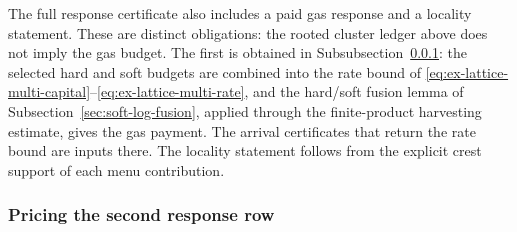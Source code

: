 The full response certificate also includes a paid gas response and a
locality statement. These are distinct obligations: the rooted cluster
ledger above does not imply the gas budget. The first is obtained in
Subsubsection~\ref{subsec:ex-lattice-rg-crowd}: the selected hard and soft
budgets are combined into the rate bound of
\eqref{eq:ex-lattice-multi-capital}--\eqref{eq:ex-lattice-multi-rate},
and the hard/soft fusion lemma of Subsection~\ref{sec:soft-log-fusion},
applied through the finite-product harvesting estimate, gives the gas
payment. The arrival certificates that return the rate bound are inputs
there. The locality statement follows
from the explicit crest support of each menu contribution.

\subsubsection{Pricing the second response row}
\label{subsec:ex-lattice-rg-crowd}

